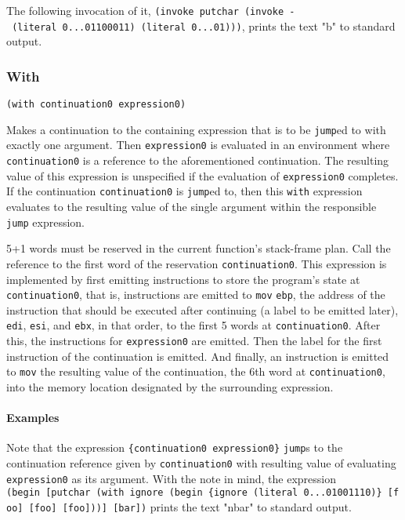 \documentclass[]{article}
\let\oldparagraph\paragraph
\renewcommand{\paragraph}[1]{\oldparagraph{#1}\mbox{}}
\begin{document}
The following invocation of it,
\texttt{(invoke\ putchar\ (invoke\ -\ (literal\ 0...01100011)\ (literal\ 0...01)))},
prints the text "b" to standard output.

\hypertarget{with}{%
\subsubsection{With}\label{with}}

\begin{verbatim}
(with continuation0 expression0)
\end{verbatim}

Makes a continuation to the containing expression that is to be
\texttt{jump}ed to with exactly one argument. Then \texttt{expression0}
is evaluated in an environment where \texttt{continuation0} is a
reference to the aforementioned continuation. The resulting value of
this expression is unspecified if the evaluation of \texttt{expression0}
completes. If the continuation \texttt{continuation0} is \texttt{jump}ed
to, then this \texttt{with} expression evaluates to the resulting value
of the single argument within the responsible \texttt{jump} expression.

5+1 words must be reserved in the current function's stack-frame plan.
Call the reference to the first word of the reservation
\texttt{continuation0}. This expression is implemented by first emitting
instructions to store the program's state at \texttt{continuation0},
that is, instructions are emitted to \texttt{mov} \texttt{ebp}, the
address of the instruction that should be executed after continuing (a
label to be emitted later), \texttt{edi}, \texttt{esi}, and
\texttt{ebx}, in that order, to the first 5 words at
\texttt{continuation0}. After this, the instructions for
\texttt{expression0} are emitted. Then the label for the first
instruction of the continuation is emitted. And finally, an instruction
is emitted to \texttt{mov} the resulting value of the continuation, the
6th word at \texttt{continuation0}, into the memory location designated
by the surrounding expression.

\hypertarget{examples}{%
\paragraph{Examples}\label{examples}}

Note that the expression \texttt{\{continuation0\ expression0\}}
\texttt{jump}s to the continuation reference given by
\texttt{continuation0} with resulting value of evaluating
\texttt{expression0} as its argument. With the note in mind, the
expression
\texttt{(begin\ {[}putchar\ (with\ ignore\ (begin\ \{ignore\ (literal\ 0...01001110)\}\ {[}foo{]}\ {[}foo{]}\ {[}foo{]})){]}\ {[}bar{]})}
prints the text "nbar" to standard output.
\end{document}
